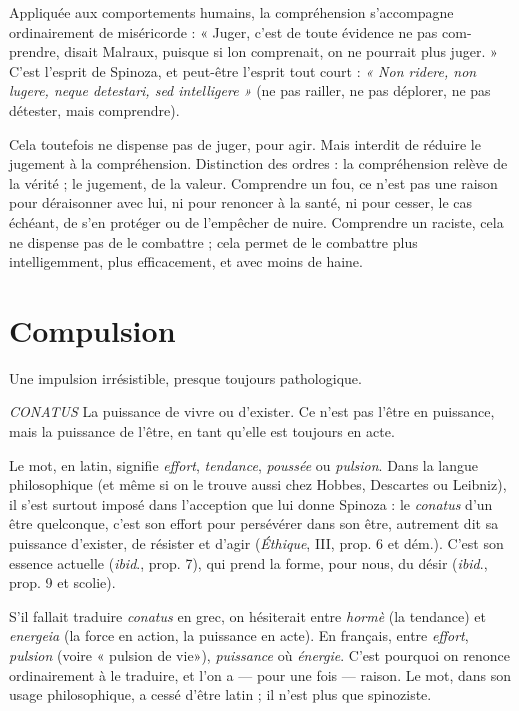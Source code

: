Appliquée aux comportements humains, la compréhension s'accompagne
ordinairement de miséricorde : « Juger, c’est de toute évidence ne pas com-
prendre, disait Malraux, puisque si lon comprenait, on ne pourrait plus
juger. » C’est l'esprit de Spinoza, et peut-être l'esprit tout court : {\it « Non ridere,
non lugere, neque detestari, sed intelligere »} (ne pas railler, ne pas déplorer, ne pas
détester, mais comprendre).

Cela toutefois ne dispense pas de juger, pour agir. Mais interdit de réduire
le jugement à la compréhension. Distinction des ordres : la compréhension
relève de la vérité ; le jugement, de la valeur. Comprendre un fou, ce n’est pas
une raison pour déraisonner avec lui, ni pour renoncer à la santé, ni pour
cesser, le cas échéant, de s’en protéger ou de l’empêcher de nuire. Comprendre
un raciste, cela ne dispense pas de le combattre ; cela permet de le combattre
plus intelligemment, plus efficacement, et avec moins de haine.

\section{Compulsion}
Une impulsion irrésistible, presque toujours pathologique.

{\it CONATUS} La puissance de vivre ou d’exister. Ce n’est pas l’être en puissance,
mais la puissance de l'être, en tant qu’elle est toujours en acte.

Le mot, en latin, signifie {\it effort}, {\it tendance}, {\it poussée} ou {\it pulsion}. Dans la langue
philosophique (et même si on le trouve aussi chez Hobbes, Descartes ou Leibniz),
il s’est surtout imposé dans l’acception que lui donne Spinoza : le {\it conatus}
d’un être quelconque, c’est son effort pour persévérer dans son être, autrement
dit sa puissance d’exister, de résister et d’agir ({\it Éthique}, III, prop. 6 et dém.).
C’est son essence actuelle ({\it ibid}., prop. 7), qui prend la forme, pour nous, du
désir ({\it ibid}., prop. 9 et scolie).

S’il fallait traduire {\it conatus} en grec, on hésiterait entre {\it hormè} (la tendance)
et {\it energeia} (la force en action, la puissance en acte). En français, entre {\it effort},
{\it pulsion} (voire « pulsion de vie»), {\it puissance} où {\it énergie}. C’est pourquoi on
renonce ordinairement à le traduire, et l’on a — pour une fois — raison. Le mot,
dans son usage philosophique, a cessé d’être latin ; il n’est plus que spinoziste.


